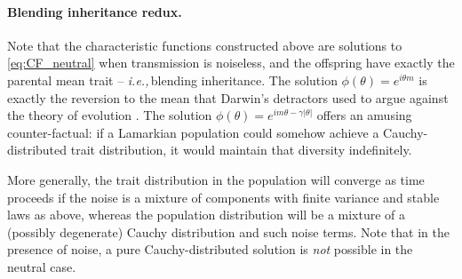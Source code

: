 \documentclass{article}
\newcommand{\ie}{\textit{i.e.,}\,}
\newcommand{\eg}{\textit{e.g.,}\,}
\newcommand{\1}{\mathbbm{1}}
\theoremstyle{remark}
\theoremstyle{definition}
\begin{document}
\paragraph{Blending inheritance redux.} 
Note that the characteristic functions constructed above are solutions to \eqref{eq:CF_neutral} when transmission is noiseless, and the offspring have exactly the parental mean trait -- \ie blending inheritance.  The solution $\phi(\theta) = e^{i\theta m}$ is exactly the reversion to the mean that Darwin's detractors used to argue against the theory of evolution \citep{jenkin1867,Provine1971}.  The solution $\phi(\theta) = e^{im \theta -\gamma|\theta|}$ offers an amusing counter-factual: if a Lamarkian population could somehow achieve a Cauchy-distributed trait distribution, it would maintain that diversity indefinitely.  




More generally, 
the trait distribution in the population will converge as time proceeds
if the noise is a mixture of components with finite variance and stable laws as above,
whereas the population distribution will be a mixture of a (possibly degenerate) Cauchy distribution and such noise terms. Note that in the presence of noise, a pure Cauchy-distributed solution is \emph{not} possible in the neutral case.
\end{document}
